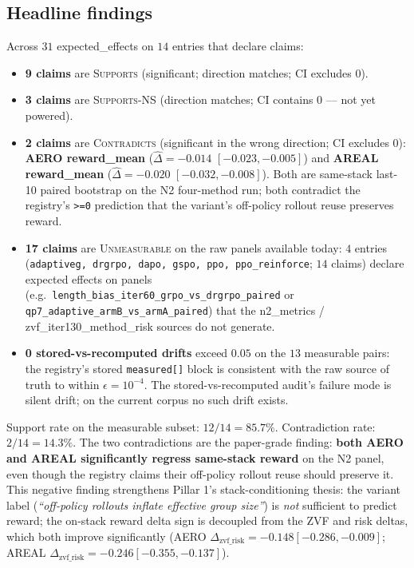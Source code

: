 \documentclass{article}
\begin{document}
\subsection{Headline findings}

Across $31$ expected\_effects on $14$ entries that declare claims:
\begin{itemize}
  \item \textbf{9 claims} are \textsc{Supports} (significant; direction
    matches; CI excludes 0).
  \item \textbf{3 claims} are \textsc{Supports-NS} (direction matches;
    CI contains 0 --- not yet powered).
  \item \textbf{2 claims} are \textsc{Contradicts} (significant in the
    wrong direction; CI excludes 0): \textbf{AERO reward\_mean}
    ($\hat\Delta=-0.014$ $[-0.023,-0.005]$) and \textbf{AREAL
    reward\_mean} ($\hat\Delta=-0.020$ $[-0.032,-0.008]$). Both are
    same-stack last-10 paired bootstrap on the N2 four-method run; both
    contradict the registry's \texttt{>=0} prediction that the variant's
    off-policy rollout reuse preserves reward.
  \item \textbf{17 claims} are \textsc{Unmeasurable} on the raw panels
    available today: $4$ entries
    (\texttt{adaptiveg, drgrpo, dapo, gspo, ppo, ppo\_reinforce}; $14$
    claims) declare expected effects on panels (e.g.\
    \texttt{length\_bias\_iter60\_grpo\_vs\_drgrpo\_paired} or
    \texttt{qp7\_adaptive\_armB\_vs\_armA\_paired}) that the
    n2\_metrics / zvf\_iter130\_method\_risk sources do not generate.
  \item \textbf{0 stored-vs-recomputed drifts} exceed $0.05$ on the $13$
    measurable pairs: the registry's stored \texttt{measured[]} block is
    consistent with the raw source of truth to within
    $\epsilon{=}10^{-4}$. The stored-vs-recomputed audit's failure mode
    is silent drift; on the current corpus no such drift exists.
\end{itemize}

Support rate on the measurable subset: $12/14 = 85.7\%$. Contradiction
rate: $2/14 = 14.3\%$. The two contradictions are the paper-grade
finding: \textbf{both AERO and AREAL significantly regress same-stack
reward} on the N2 panel, even though the registry claims their
off-policy rollout reuse should preserve it. This negative finding
strengthens Pillar 1's stack-conditioning thesis: the variant label
(\textit{``off-policy rollouts inflate effective group size''}) is
\emph{not} sufficient to predict reward; the on-stack reward delta
sign is decoupled from the ZVF and risk deltas, which both improve
significantly (AERO $\Delta_{\text{zvf\_risk}}=-0.148 [-0.286,-0.009]$;
AREAL $\Delta_{\text{zvf\_risk}}=-0.246 [-0.355,-0.137]$).
\end{document}
